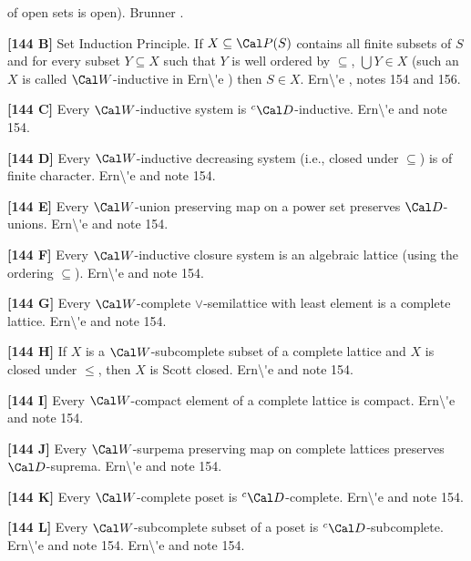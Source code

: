 of open sets is open).  \ac{Brunner} \cite{1984c}.
\smallskip
\item{}{\bf [144 B]} Set Induction Principle.  If $X
\subseteq \Cal P(S)$ contains all finite subsets of $S$ and for
every subset $Y\subseteq X$ such that $Y$ is well ordered
by $\subseteq$, $\bigcup Y\in X$
(such an $X$ is called $\Cal W$-inductive in \ac{Ern\'e} \cite{2000})
then $S\in X$. \ac{Ern\'e} \cite{2000}, notes 154 and 156.
\smallskip
\item{}{\bf [144 C]} Every $\Cal W$-inductive system is $^c\Cal
D$-inductive.  \ac{Ern\'e} \cite{2000} and note 154.
\smallskip
\item{}{\bf [144 D]} Every $\Cal W$-inductive decreasing system
(i.e., closed under $\subseteq$) is of finite character.
\ac{Ern\'e} \cite{2000} and note 154.  
\smallskip
\item{}{\bf [144 E]} Every $\Cal W$-union preserving map on a
power set preserves $\Cal D$-unions. \ac{Ern\'e} \cite{2000} and note
154.
\smallskip
\item{}{\bf [144 F]} Every $\Cal W$-inductive closure system is
an algebraic lattice (using the ordering $\subseteq$).
\ac{Ern\'e} \cite{2000} and note 154. 
 
\smallskip
\item{}{\bf [144 G]} Every $\Cal W$-complete $\lor$-semilattice
with least element is a complete lattice.  \ac{Ern\'e} \cite{2000} and
note 154.  
\smallskip
\item{}{\bf [144 H]} If $X$ is a $\Cal W$-subcomplete subset of a
complete lattice and $X$ is closed under $\le$, then $X$ is Scott
closed.  \ac{Ern\'e} \cite{2000} and note 154. 
\smallskip
\item{}{\bf [144 I]}  Every $\Cal W$-compact element of a complete
lattice is compact.  \ac{Ern\'e} \cite{2000} and note 154.
\smallskip
\item{}{\bf [144 J]} Every $\Cal W$-surpema preserving map on
complete lattices preserves $\Cal D$-suprema.
\ac{Ern\'e} \cite{2000} and note 154.
\smallskip
\item{}{\bf [144 K]} Every $\Cal W$-complete poset is $^c\Cal
D$-complete.  \ac{Ern\'e} \cite{2000} and note 154.
\smallskip
\item{}{\bf [144 L]}  Every $\Cal W$-subcomplete subset of a poset
is $^c\Cal D$-subcomplete.  \ac{Ern\'e} \cite{2000} and note 154.
\ac{Ern\'e} \cite{2000} and note 154.  
